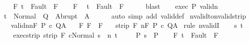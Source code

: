 \begin{isabellebody}
\ \ \isamarkupfalse%
\ F{\isacharcolon}\ {\isachardoublequoteopen}t\ {\isasymnotin}\ Fault\ {\isacharbackquote}\ F{\isacharprime}{\isachardoublequoteclose}\isanewline
\ \ \isamarkupfalse%
\ F{\isacharprime}\ \isamarkupfalse%
\ {\isachardoublequoteopen}t\ {\isasymnotin}\ Fault\ {\isacharbackquote}\ F{\isachardoublequoteclose}\isanewline
\ \ \ \ \isamarkupfalse%
\ blast\isanewline
\ \ \isamarkupfalse%
\ exec\ P\ validn\isanewline
\ \ \isamarkupfalse%
\ {\isachardoublequoteopen}t\ {\isasymin}\ Normal\ {\isacharbackquote}\ Q\ {\isasymunion}\ Abrupt\ {\isacharbackquote}\ A{\isachardoublequoteclose}\isanewline
\ \ \ \ \isamarkupfalse%
\ {\isacharparenleft}auto\ simp\ add{\isacharcolon}\ valid{\isacharunderscore}def{\isacharparenright}\isanewline
{}\isamarkupfalse%
%
\endisatagproof
{\isafoldproof}%
%
\isadelimproof
\isanewline
%
\endisadelimproof
\isanewline
{}\isamarkupfalse%
\ nvalid{\isacharunderscore}to{\isacharunderscore}nvalid{\isacharunderscore}strip{\isacharcolon}\isanewline
\ \ \ validn{\isacharcolon}{\isachardoublequoteopen}{\isasymGamma}{\isasymTurnstile}n{\isacharcolon}\isactrlbsub {\isacharslash}F\isactrlesub \ P\ c\ Q{\isacharcomma}A{\isachardoublequoteclose}\isanewline
\ \ \ F{\isacharprime}{\isacharcolon}\ {\isachardoublequoteopen}F{\isacharprime}\ {\isasymsubseteq}\ {\isacharminus}F{\isachardoublequoteclose}\isanewline
\ \ \ {\isachardoublequoteopen}strip\ F{\isacharprime}\ {\isasymGamma}{\isasymTurnstile}n{\isacharcolon}\isactrlbsub {\isacharslash}F\isactrlesub \ P\ c\ Q{\isacharcomma}A{\isachardoublequoteclose}\isanewline
%
\isadelimproof
%
\endisadelimproof
%
\isatagproof
{}\isamarkupfalse%
\ {\isacharparenleft}rule\ nvalidI{\isacharparenright}\isanewline
\ \ \isamarkupfalse%
\ s\ t\isanewline
\ \ \isamarkupfalse%
\ exec{\isacharunderscore}strip{\isacharcolon}\ {\isachardoublequoteopen}strip\ F{\isacharprime}\ {\isasymGamma}{\isasymturnstile}{\isasymlangle}c{\isacharcomma}Normal\ s\ {\isasymrangle}\ {\isacharequal}n{\isasymRightarrow}\ t{\isachardoublequoteclose}\ \isanewline
\ \ \isamarkupfalse%
\ P{\isacharcolon}\ {\isachardoublequoteopen}s\ {\isasymin}\ P{\isachardoublequoteclose}\isanewline
\ \ \isamarkupfalse%
\ F{\isacharcolon}\ {\isachardoublequoteopen}t\ {\isasymnotin}\ Fault\ {\isacharbackquote}\ F{\isachardoublequoteclose}\isanewline
\ \ \isamarkupfalse%

\end{isabellebody}
